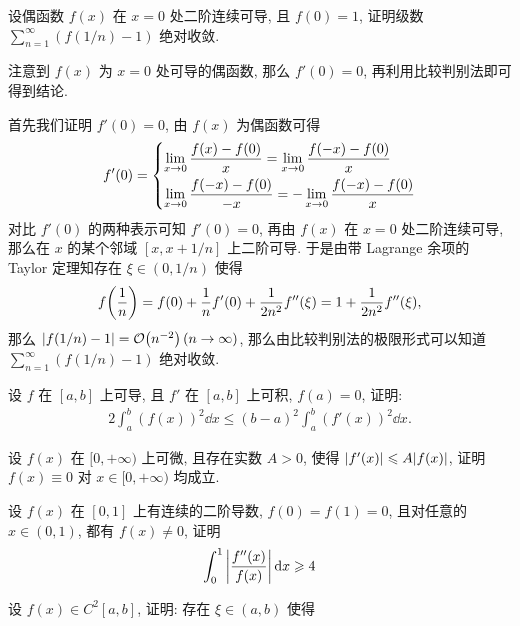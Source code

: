 \begin{exercise}[series=exer]
    \item 设偶函数 $ f(x) $ 在 $ x = 0 $ 处二阶连续可导, 且 $ f(0) = 1 $, 证明级数 $ \sum_{n = 1}^{\infty} (f(1/n) - 1) $ 绝对收敛.
    \begin{hint}
        注意到 $ f(x) $ 为 $ x = 0 $ 处可导的偶函数, 那么 $ f'(0) = 0 $, 再利用比较判别法即可得到结论.
    \end{hint}
    \begin{answer}
        首先我们证明 $ f'(0) = 0 $, 由 $ f(x) $ 为偶函数可得
        \begin{align*}
            f'(0) = \begin{dcases}
                \lim_{x \to 0}\frac{f(x) - f(0)}{x} = \lim_{x \to 0}\frac{f(-x) - f(0)}{x} \\
                \lim_{x \to 0} \frac{f(-x) - f(0)}{-x} = -\lim_{x \to 0}\frac{f(-x) - f(0)}{x}
            \end{dcases}
        \end{align*}
        对比 $ f'(0) $ 的两种表示可知 $ f'(0) = 0 $, 再由 $ f(x) $ 在 $ x = 0 $ 处二阶连续可导, 那么在 $ x $ 的某个邻域 $ [x, x+1/n] $ 上二阶可导. 于是由带 Lagrange 余项的 Taylor 定理知存在 $ \xi \in (0, 1/n) $ 使得
        \begin{align*}
            f\qty(\frac{1}{n}) = f(0) + \frac{1}{n}f'(0) + \frac{1}{2n^{2}}f''(\xi) = 1 + \frac{1}{2n^{2}}f''(\xi), 
        \end{align*}
        那么 $ \abs{f(1/n) - 1} = \order{n^{-2}}\,(n \to \infty) $, 那么由比较判别法的极限形式可以知道 $ \sum_{n = 1}^{\infty} (f(1/n) - 1) $ 绝对收敛.
    \end{answer}
    \item 设 $ f $ 在 $ [a, b] $ 上可导, 且 $ f' $ 在 $ [a, b] $ 上可积, $ f(a) = 0 $, 证明:
    \begin{align*}
        2\int_{a}^{b}(f(x))^{2} \dd{x} \le (b-a)^{2} \int_{a}^{b} (f'(x))^{2} \dd{x}.
    \end{align*}
    \item 设 $ f(x) $ 在 $ [0, +\infty) $ 上可微, 且存在实数 $ A > 0 $, 使得 $ \abs{f'(x)} \leqslant A\abs{f(x)} $, 证明 $ f(x) \equiv 0 $ 对 $ x \in [0, +\infty) $ 均成立.
    \item 设 $ f(x) $ 在 $ [0, 1] $ 上有连续的二阶导数, $ f(0) = f(1) = 0 $, 且对任意的 $ x \in (0, 1) $, 都有 $ f(x) \ne 0 $, 证明
    \begin{align*}
        \int_{0}^{1} \abs{f''(x)\over f(x)} \dd{x} \geqslant 4
    \end{align*}
    \item 设 $ f(x) \in C^{2}[a, b] $, 证明: 存在 $ \xi \in (a, b) $ 使得

\end{exercise}
